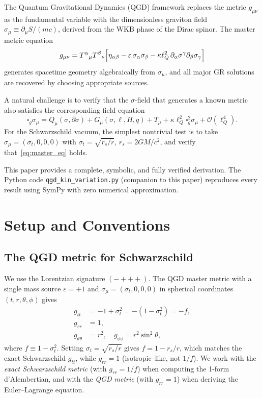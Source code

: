 \documentclass[11pt,a4paper]{article}
\theoremstyle{plain}
\theoremstyle{definition}
\newcommand{\sig}{\sigma}
\newcommand{\sigt}{\sigma_t}
\newcommand{\rs}{r_s}
\newcommand{\lQ}{\ell_Q}
\newcommand{\boxg}{\square_g}
\begin{document}
The Quantum Gravitational Dynamics (QGD) framework
\cite{matshaba2026} replaces the metric $g_{\mu\nu}$ as the
fundamental variable with the dimensionless graviton field
$\sig_\mu \equiv \partial_\mu S / (mc)$, derived from the WKB phase of the
Dirac spinor.  The master metric equation
\begin{equation}\label{eq:master_metric}
  g_{\mu\nu} = T^\alpha{}_\mu T^\beta{}_\nu
  \Bigl[\eta_{\alpha\beta}
      - \varepsilon\,\sig_\alpha\sig_\beta
      - \kappa\lQ^2\,\partial_\alpha\sig^\gamma\partial_\beta\sig_\gamma\Bigr]
\end{equation}
generates spacetime geometry algebraically from $\sig_\mu$, and all
major GR solutions are recovered by choosing appropriate sources.

A natural challenge is to verify that the $\sig$-field that
generates a known metric also satisfies the corresponding field equation
\begin{equation}\label{eq:master_eq}
  \boxg\sig_\mu = Q_\mu(\sig,\partial\sig)
                 + G_\mu(\sig,\ell,H,q)
                 + T_\mu
                 + \kappa\lQ^2\boxg^2\sig_\mu
                 + \mathcal{O}(\lQ^4).
\end{equation}
For the Schwarzschild vacuum, the simplest nontrivial test is to take
$\sig_\mu = (\sigt,0,0,0)$ with $\sigt = \sqrt{\rs/r}$, $\rs = 2GM/c^2$,
and verify that~\eqref{eq:master_eq} holds.

This paper provides a complete, symbolic, and fully verified derivation.
The Python code \texttt{qgd\_kin\_variation.py} (companion to this paper)
reproduces every result using SymPy with zero numerical approximation.

\section{Setup and Conventions}

\subsection{The QGD metric for Schwarzschild}

We use the Lorentzian signature $(-{+}{+}{+})$.  The QGD master metric
with a single mass source $\varepsilon=+1$ and $\sig_\mu = (\sigt,0,0,0)$
in spherical coordinates $(t,r,\theta,\phi)$ gives
\begin{align}
  g_{tt} &= -1 + \sigt^2 = -(1-\sigt^2) = -f, \label{eq:gtt}\\
  g_{rr} &= 1, \label{eq:grr}\\
  g_{\theta\theta} &= r^2, \quad g_{\phi\phi} = r^2\sin^2\theta,
\end{align}
where $f \equiv 1 - \sigt^2$.  Setting $\sigt = \sqrt{\rs/r}$ gives
$f = 1-\rs/r$, which matches the exact Schwarzschild $g_{tt}$, while
$g_{rr} = 1$ (isotropic--like, not $1/f$).  We work with the
\emph{exact Schwarzschild metric} (with $g_{rr}=1/f$) when computing
the 1-form d'Alembertian, and with the \emph{QGD metric}
(with $g_{rr}=1$) when deriving the Euler--Lagrange equation.
\end{document}
